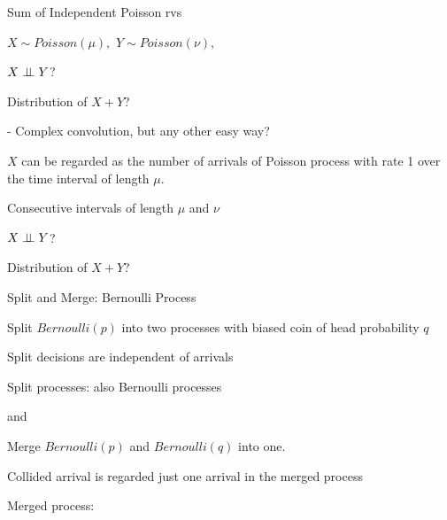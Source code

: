 \begin{frame}{Sum of Independent Poisson rvs}

\plitemsep 0.1in

\bci

\item $X \sim Poisson(\mu),$  $Y \sim Poisson(\nu),$

\item<2->  $X \perp \!\!\! \perp Y$?

\item<3->  Distribution of $X+Y$?

- Complex convolution, but any other easy way?

\item<4-> $X$ can be regarded as the number of arrivals of Poisson process with rate 1 over the time interval of length $\mu.$

\item<5-> Consecutive intervals of length $\mu$ and $\nu$

\item<6->  $X \perp \!\!\! \perp Y$? 

\item<7->  Distribution of $X+Y$? 

\eci


\end{frame}


\begin{frame}{Split and Merge: Bernoulli Process}

{
\small
\plitemsep 0.05in
\bci
\item Split $Bernoulli(p)$ into two processes with biased coin of head probability $q$

\item<2-> Split decisions are independent of arrivals

\item<3-> Split processes: also Bernoulli processes

\item<3->  and 

\eci

\medskip
\centering
{}

}
{
\small
\plitemsep 0.05in
\bci
\item Merge $Bernoulli(p)$ and $Bernoulli(q)$ into one.

\item<4-> Collided arrival is regarded just one arrival in the merged process

\item<5-> Merged process: 
\eci

\centering
{}

}

\end{frame}


